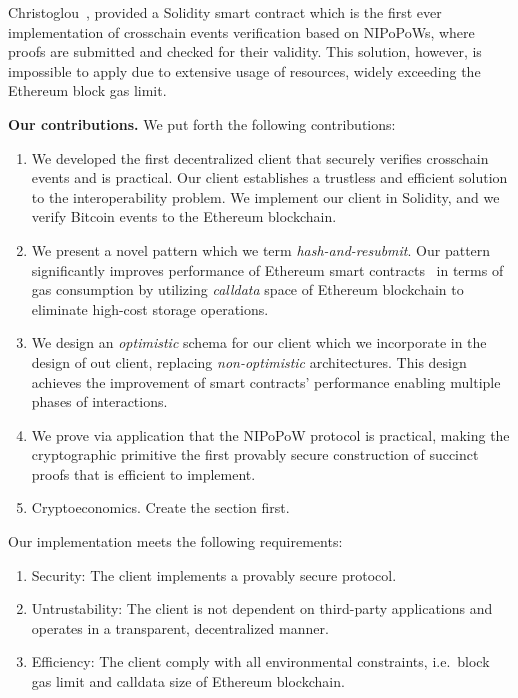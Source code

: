 Christoglou~\cite{gglou}, provided a Solidity smart contract which is the first
ever implementation of crosschain events verification based on NIPoPoWs, where
proofs are submitted and checked for their validity. This solution, however, is
impossible to apply due to extensive usage of resources, widely exceeding the
Ethereum block gas limit.

\noindent

\textbf{Our contributions.} We put forth the following contributions:
\begin{enumerate}
\item We developed the first decentralized client that securely verifies
crosschain events and is practical. Our client establishes a trustless and
efficient solution to the interoperability problem. We implement our client
in Solidity, and we verify Bitcoin events to the Ethereum blockchain.
\item We present a novel pattern which we term \emph{hash-and-resubmit}. Our
pattern significantly improves performance of Ethereum smart
contracts~\cite{wood, buterin} in terms of gas consumption by utilizing
\emph{calldata} space of Ethereum blockchain to eliminate high-cost storage
operations.
\item We design an \emph{optimistic} schema for our client which we incorporate in
the design of out client, replacing \emph{non-optimistic} architectures.
This design achieves the improvement of smart contracts' performance enabling
multiple phases of interactions.
\item We prove via application that the NIPoPoW protocol is practical, making
the cryptographic primitive the first provably secure construction of succinct
proofs that is efficient to implement.
\item Cryptoeconomics. Create the section first.

\end{enumerate}

Our implementation meets the following requirements:
\begin{enumerate}
\item Security: The client implements a provably secure protocol.
\item Untrustability: The client is not dependent on third-party applications
and operates in a transparent, decentralized manner.
\item Efficiency: The client comply with all environmental constraints, i.e.\
block gas limit and calldata size of Ethereum blockchain.
\end{enumerate}

